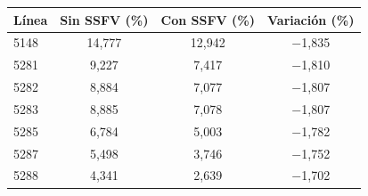 \begin{tabular}{lccc}
\toprule
\textbf{Línea} & \textbf{Sin SSFV (\%)} & \textbf{Con SSFV (\%)} & \textbf{Variación (\%)} \\
\midrule
5148 & 14,777 & 12,942 & $-$1,835 \\
5281 & 9,227 & 7,417 & $-$1,810 \\
5282 & 8,884 & 7,077 & $-$1,807 \\
5283 & 8,885 & 7,078 & $-$1,807 \\
5285 & 6,784 & 5,003 & $-$1,782 \\
5287 & 5,498 & 3,746 & $-$1,752 \\
5288 & 4,341 & 2,639 & $-$1,702 \\
\bottomrule
\end{tabular}
